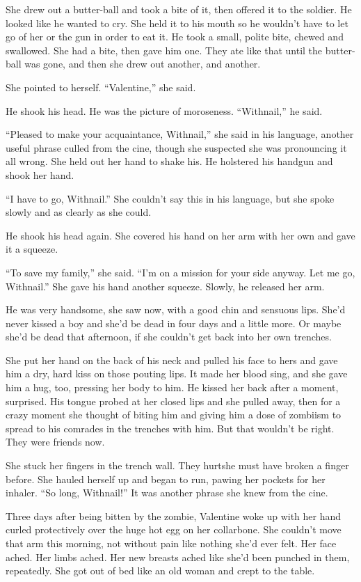 She drew out a butter-ball and took a bite of it, then offered it
to the soldier. He looked like he wanted to cry. She held it to his
mouth so he wouldn’t have to let go of her or the gun in order to
eat it. He took a small, polite bite, chewed and swallowed. She had
a bite, then gave him one. They ate like that until the butter-ball
was gone, and then she drew out another, and another.

She pointed to herself. “Va\-len\-tine,” she said.

He shook his head. He was the picture of moroseness. “Withnail,” he
said.

“Pleased to make your acquaintance, Withnail,” she said in his
language, another useful phrase culled from the cine, though she
suspected she was pronouncing it all wrong. She held out her hand
to shake his. He holstered his handgun and shook her hand.

“I have to go, Withnail.” She couldn’t say this in his language,
but she spoke slowly and as clearly as she could.

He shook his head again. She covered his hand on her arm with her
own and gave it a squeeze.

“To save my family,” she said. “I’m on a mission for your side
anyway. Let me go, Withnail.” She gave his hand another squeeze.
Slowly, he released her arm.

He was very handsome, she saw now, with a good chin and sensuous
lips. She’d never kissed a boy and she’d be dead in four days and a
little more. Or maybe she’d be dead that afternoon, if she couldn’t
get back into her own trenches.

She put her hand on the back of his neck and pulled his face to
hers and gave him a dry, hard kiss on those pouting lips. It made
her blood sing, and she gave him a hug, too, pressing her body to
him. He kissed her back after a moment, surprised. His tongue
probed at her closed lips and she pulled away, then for a crazy
moment she thought of biting him and giving him a dose of zombiism
to spread to his comrades in the trenches with him. But that
wouldn’t be right. They were friends now.

She stuck her fingers in the trench wall. They hurt\dash{}she must have
broken a finger before. She hauled herself up and began to run,
pawing her pockets for her inhaler. “So long, Withnail!” It was
another phrase she knew from the cine.

\tb

Three days after being bitten by the zombie, Valentine woke up with
her hand curled protectively over the huge hot egg on her
collarbone. She couldn’t move that arm this morning, not without
pain like nothing she’d ever felt. Her face ached. Her limbs ached.
Her new breasts ached like she’d been punched in them, repeatedly.
She got out of bed like an old woman and crept to the table.


